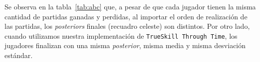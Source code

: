 \documentclass[11pt,twoside,spanish]{report} %
\begin{document}
\begin{table}[H]
\centering
{}
\caption{\textit{Posteriors} de tres partidas utilizando \texttt{TrueSkill} con jugadores inicializados con una media de $25$ y una incertidumbre de $6$. Se recuadra en celeste el \textit{posterior} final de cada jugador.}
\label{tab:abc}
\end{table}

Se observa en la tabla~\ref{tab:abc} que, a pesar de que cada jugador tienen la misma cantidad de partidas ganadas y perdidas, al importar el orden de realizaci\'on de las partidas, los \textit{posteriors} finales (recuadro celeste) son distintos.
Por otro lado, cuando utilizamos nuestra implementaci\'on de \texttt{TrueSkill Through Time}, los jugadores finalizan con una misma \textit{posterior}, misma media y misma desviaci\'on est\'andar.
\end{document}
